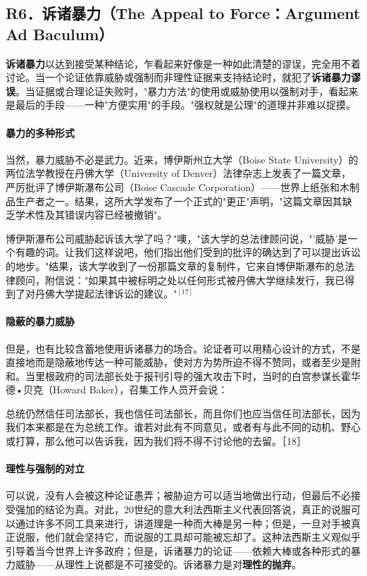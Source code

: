 \subsection{R6．诉诸暴力（The Appeal to Force：Argument Ad Baculum）}

\textbf{诉诸暴力}以达到接受某种结论，乍看起来好像是一种如此清楚的谬误，完全用不着讨论。当一个论证依靠威胁或强制而非理性证据来支持结论时，就犯了\textbf{诉诸暴力谬误}。当证据或合理论证失败时，"暴力方法"的使用或威胁使用以强制对手，看起来是最后的手段——一种"方便实用"的手段。"强权就是公理"的道理并非难以捉摸。

\paragraph{暴力的多种形式}
当然，暴力威胁不必是武力。近来，博伊斯州立大学（Boise State University）的两位法学教授在丹佛大学（University of Denver）法律杂志上发表了一篇文章，严厉批评了博伊斯瀑布公司（Boise Cascade Corporation）——世界上纸张和木制品生产者之一。结果，这所大学发布了一个正式的"更正"声明，"这篇文章因其缺乏学术性及其错误内容已经被撤销"。

博伊斯瀑布公司威胁起诉该大学了吗？"噢，"该大学的总法律顾问说，"'威胁'是一个有趣的词。让我们这样说吧，他们指出他们受到的批评的确达到了可以提出诉讼的地步。"结果，该大学收到了一份那篇文章的复制件，它来自博伊斯瀑布的总法律顾问，附信说："如果其中被标明之处以任何形式被丹佛大学继续发行，我已得到了对丹佛大学提起法律诉讼的建议。"${ }^{[17]}$

\paragraph{隐蔽的暴力威胁}
但是，也有比较含蓄地使用诉诸暴力的场合。论证者可以用精心设计的方式，不是直接地而是隐蔽地传达一种可能威胁，使对方为势所迫不得不赞同，或者至少是附和。当里根政府的司法部长处于报刊引导的强大攻击下时，当时的白宫参谋长霍华德•贝克（Howard Baker），召集工作人员开会说：

\begin{displayquote}
总统仍然信任司法部长，我也信任司法部长，而且你们也应当信任司法部长，因为我们本来都是在为总统工作。谁若对此有不同意见，或者有与此不同的动机、野心或打算，那么他可以告诉我，因为我们将不得不讨论他的去留。［18］
\end{displayquote}

\paragraph{理性与强制的对立}
可以说，没有人会被这种论证愚弄；被胁迫方可以适当地做出行动，但最后不必接受强加的结论为真。对此，20世纪的意大利法西斯主义代表回答说，真正的说服可以通过许多不同工具来进行，讲道理是一种而大棒是另一种；但是，一旦对手被真正说服，他们就会坚持它，而说服的工具却可能被忘却了。这种法西斯主义观似乎引导着当今世界上许多政府；但是，诉诸暴力的论证——依赖大棒或各种形式的暴力威胁——从理性上说都是不可接受的。诉诸暴力是对\textbf{理性的抛弃}。 